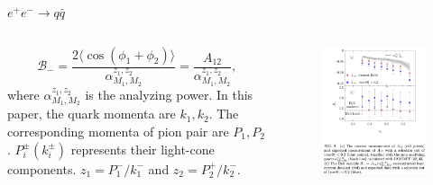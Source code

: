 \documentclass{beamer}
\begin{document}
    \begin{frame}{$e^+e^-\to q\bar{q}$ \footnotesize {}}
        \begin{columns}
            \begin{column}{0.5\textwidth}
                \begin{equation*}
                    \mathcal{B}_- = \frac{2\langle\cos(\phi_1+\phi_2)\rangle}{\alpha^{z_1,z_2}_{M_1,M_2}} = \frac{A_{12}}{\alpha^{z_1,z_2}_{M_1,M_2}},
                \end{equation*}
                where $\alpha^{z_1,z_2}_{M_1,M_2}$ is the analyzing power. 
                In this paper, the quark momenta are $k_1, k_2$. The corresponding momenta of pion pair are $P_1,P_2$. 
                $P^\pm_i(k^\pm_i)$ represents their light-cone components.
                $z_1=P^-_1/k^-_1$ and $z_2=P^+_2/k^-_2$.
            \end{column}
            \begin{column}{0.5\textwidth}
                \begin{figure}[htbp]
                    \centering
                    \includegraphics[width=0.8\linewidth]{img/eeqq2.png}
                \end{figure}
            \end{column}
        \end{columns}
    \end{frame}
\end{document}
